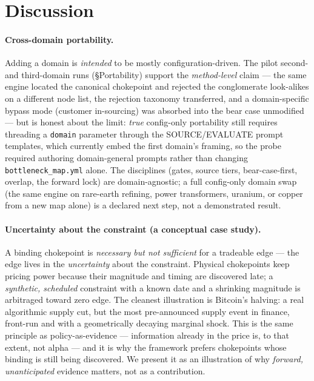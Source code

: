 \documentclass[11pt]{article}
\begin{document}
\section{Discussion}
\paragraph{Cross-domain portability.} Adding a domain is \emph{intended} to be mostly
configuration-driven. The pilot second- and third-domain runs (\S Portability) support the \emph{method-level}
claim --- the same engine located the canonical chokepoint and rejected the conglomerate look-alikes
on a different node list, the rejection taxonomy transferred, and a domain-specific bypass mode
(customer in-sourcing) was absorbed into the bear case unmodified --- but is honest about the limit:
\emph{true} config-only portability still requires threading a \texttt{domain} parameter through the
SOURCE/EVALUATE prompt templates, which currently embed the first domain's framing, so the probe
required authoring domain-general prompts rather than changing \texttt{bottleneck\_map.yml} alone. The
disciplines (gates, source tiers, bear-case-first, overlap, the forward lock) are domain-agnostic; a
full config-only domain swap (the same engine on rare-earth refining, power transformers, uranium, or
copper from a new map alone) is a declared next step, not a demonstrated result.

\paragraph{Uncertainty about the constraint (a conceptual case study).} A binding chokepoint is
\emph{necessary but not sufficient} for a tradeable edge --- the edge lives in the \emph{uncertainty}
about the constraint. Physical chokepoints keep pricing power because their magnitude and timing are
discovered late; a \emph{synthetic, scheduled} constraint with a known date and a shrinking magnitude
is arbitraged toward zero edge. The cleanest illustration is Bitcoin's halving: a real algorithmic
supply cut, but the most pre-announced supply event in finance, front-run and with a geometrically
decaying marginal shock. This is the same principle as policy-as-evidence --- information already in
the price is, to that extent, not alpha --- and it is why the framework prefers chokepoints whose
binding is still being discovered. We present it as an illustration of why \emph{forward,
unanticipated} evidence matters, not as a contribution.
\end{document}
